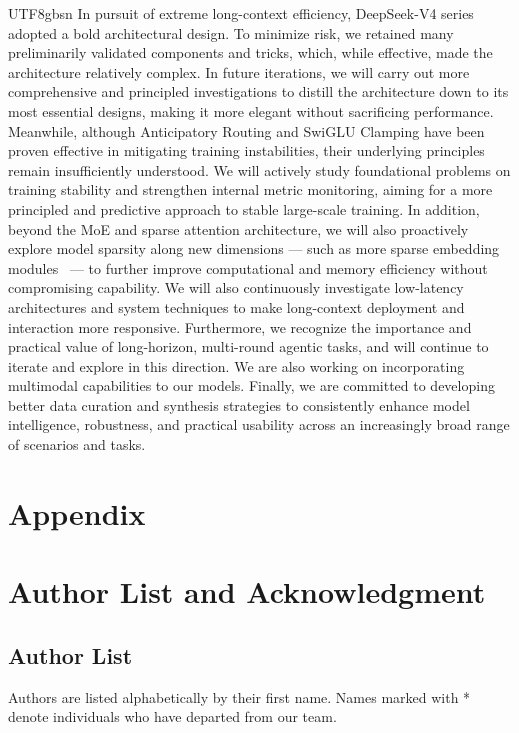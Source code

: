 \documentclass[11pt, a4paper, logo, copyright, nonumbering]{deepseek}
\newcommand{\dsviv}{DeepSeek-V4}
\begin{document}
\begin{CJK*}{UTF8}{gbsn}
In pursuit of extreme long-context efficiency, \dsviv{} series adopted a bold architectural design. 
To minimize risk, we retained many preliminarily validated components and tricks, which, while effective, made the architecture relatively complex. 
In future iterations, we will carry out more comprehensive and principled investigations to distill the architecture down to its most essential designs, making it more elegant without sacrificing performance. 
Meanwhile, although Anticipatory Routing and SwiGLU Clamping have been proven effective in mitigating training instabilities, their underlying principles remain insufficiently understood. 
We will actively study foundational problems on training stability and strengthen internal metric monitoring, aiming for a more principled and predictive approach to stable large-scale training. 
In addition, beyond the MoE and sparse attention architecture, we will also proactively explore model sparsity along new dimensions --- such as more sparse embedding modules~\citep{engram} --- to further improve computational and memory efficiency without compromising capability. 
We will also continuously investigate low-latency architectures and system techniques to make long-context deployment and interaction more responsive.
Furthermore, we recognize the importance and practical value of long-horizon, multi-round agentic tasks, and will continue to iterate and explore in this direction.
We are also working on incorporating multimodal capabilities to our models. 
Finally, we are committed to developing better data curation and synthesis strategies to consistently enhance model intelligence, robustness, and practical usability across an increasingly broad range of scenarios and tasks.



\newpage
\appendix

\section*{Appendix}

\section{Author List and Acknowledgment}

\subsection{Author List}

Authors are listed alphabetically by their first name. 
Names marked with * denote individuals who have departed from our team. 


\end{CJK*}
\end{document}
